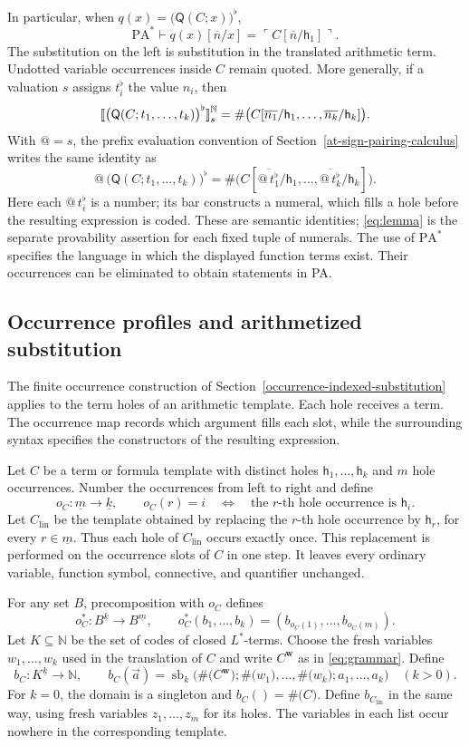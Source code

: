\documentclass[11pt]{article}
\makeatletter
\newcommand{\llbracket}{\mathopen{[\mkern-3mu[}}
\newcommand{\rrbracket}{\mathclose{]\mkern-3mu]}}
\newcommand{\atsign}{\mathord{@}}
\newcommand{\finord}[1]{\underline{#1}}
\newcommand{\N}{\mathbb N}
\newcommand{\PA}{\mathrm{PA}^{*}}
\newcommand{\sbop}{\operatorname{sb}}
\newcommand{\Q}{\mathsf Q}
\newcommand{\h}{\mathsf h}
\newcommand{\code}[1]{\#\bigl(#1\bigr)}
\newcommand{\quo}[1]{\ulcorner #1\urcorner}
\newcommand{\bn}[1]{\overline{#1}}
\newcommand{\flatof}[1]{\bigl(#1\bigr)^{\flat}}
\theoremstyle{definition}
\makeatother
\begin{document}
In particular, when $q(x)=\flatof{\Q(C;x)}$,
\[
  \PA\vdash q(x)[\bn n/x]=\quo{C[\bn n/\h_1]}.
\]
The substitution on the left is substitution in the translated
arithmetic term. Undotted variable occurrences inside $C$ remain quoted.
More generally, if a valuation $s$ assigns $t_i^{\flat}$ the value $n_i$,
then
\[
 \llbracket\flatof{\Q(C;t_1,\ldots,t_k)}\rrbracket^{\N}_s
   =\code{C[\bn{n_1}/\h_1,\ldots,\bn{n_k}/\h_k]}.
\]
With $\atsign=s$, the prefix evaluation convention of
Section~\ref{at-sign-pairing-calculus} writes the same identity as
\[
 \atsign\,\flatof{\Q(C;t_1,\ldots,t_k)}
 =\code{C[\overline{\atsign\,t_1^{\flat}}/\h_1,\ldots,
                \overline{\atsign\,t_k^{\flat}}/\h_k]}.
\]
Here each $\atsign\,t_i^{\flat}$ is a number; its bar constructs a
numeral, which fills a hole before the resulting expression is coded.
These are semantic identities; \eqref{eq:lemma} is the separate
provability assertion for each fixed tuple of numerals. The use of
$\PA$ specifies the language in which the displayed function terms
exist. Their occurrences can be eliminated to obtain statements in PA.

\subsection{Occurrence profiles and arithmetized substitution}
\label{app:occurrence-feferman}

The finite occurrence construction of
Section~\ref{occurrence-indexed-substitution} applies to the term holes of
an arithmetic template. Each hole receives a term. The occurrence map
records which argument fills each slot, while the surrounding syntax
specifies the constructors of the resulting expression.

Let $C$ be a term or formula template with distinct holes
$\h_1,\ldots,\h_k$ and $m$ hole occurrences. Number the occurrences from
left to right and define
\[
 o_C:\finord m\longrightarrow\finord k,
 \qquad o_C(r)=i
 \quad\Longleftrightarrow\quad
 \text{the $r$-th hole occurrence is $\h_i$}.
\]
Let $C_{\mathrm{lin}}$ be the template obtained by replacing the $r$-th
hole occurrence by $\h_r$, for every $r\in\finord m$. Thus each hole of
$C_{\mathrm{lin}}$ occurs exactly once. This replacement is performed on
the occurrence slots of $C$ in one step. It leaves every ordinary variable,
function symbol, connective, and quantifier unchanged.

For any set $B$, precomposition with $o_C$ defines
\[
 o_C^*:B^{\finord k}\longrightarrow B^{\finord m},
 \qquad
 o_C^*(b_1,\ldots,b_k)
   =(b_{o_C(1)},\ldots,b_{o_C(m)}).
\]
Let $K\subseteq\N$ be the set of codes of closed $L^{*}$-terms. Choose
the fresh variables $w_1,\ldots,w_k$ used in the translation of $C$ and
write $C^{\mathbf w}$ as in \eqref{eq:grammar}. Define
\[
 b_C:K^{\finord k}\longrightarrow\N,
 \qquad
 b_C(\vec a)=
 \sbop_k\bigl(\code{C^{\mathbf w}};
       \code{w_1},\ldots,\code{w_k};a_1,\ldots,a_k\bigr)
 \quad(k>0).
\]
For $k=0$, the domain is a singleton and $b_C()=\code C$.
Define $b_{C_{\mathrm{lin}}}$ in the same way, using fresh variables
$z_1,\ldots,z_m$ for its holes. The variables in each list occur nowhere
in the corresponding template.
\end{document}
